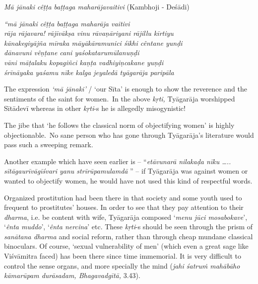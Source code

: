 \textit{Mā jānaki cêṭṭa baṭṭaga maharājavaitivi} (Kambhoji - Deśādi)

\begin{longquote}
\textit{“mā jānaki cêṭṭa baṭṭaga maharāja vaitivi}\\\textit{rāja rājavara! rājīvākṣa vinu rāvaṇāriyani rājillu kīrtiyu}\\\textit{kānakegiyājña mīraka māyākāramunici śikhi cêntane yunḍi}\\\textit{dānavuni vêṇṭane cani yaśokatarumūlanuṇḍi}\\ \textit{vāni māṭalaku kopagiñci kaṇṭa vadhiyiṇcakane yuṇḍi} \\\textit{śrīnāyaka yaśamu nīke kalga jeyaledā tyāgarāja paripāla}
\end{longquote}

\newpage

The expression \textit{‘mā jānaki’} / ‘our Sīta’ is enough to show the reverence and the sentiments of the saint for women.~In the above \textit{kṛti,} Tyāgarāja worshipped Sītādevī whereas in other \textit{kṛti}-s he is allegedly misogynistic! 

The jibe that ‘he follows the classical norm of objectifying women’ is highly objectionable.~No sane person who has gone through Tyāgarāja’s literature would pass such a sweeping remark. 

Another example which have seen earlier is – “\textit{etāvunarā nilakaḍa nīku ….. sītāgaurīvāgīśvari yanu strīrūpamulamdā} ” – if Tyāgarāja was against women or wanted to objectify women, he would have not used this kind of respectful words.

Organized prostitution had been there in that society and some youth used to frequent to prostitutes’ houses. In order to see that they pay attention to their \textit{dharma}, i.e. be content with wife, Tyāgarāja composed ‘\textit{menu jūci mosabokave}’, ‘\textit{ênta muddo}’, ‘\textit{ênta nercina}’ etc. These \textit{kṛti}-s should be seen through the prism of \textit{sanātana dharma} and social reform, rather than through cheap mundane classical binoculars. Of course, ‘sexual vulnerability of men’ (which even a great sage like Viśvāmitra faced) has been there since time immemorial. It is very difficult to control the sense organs, and more specially the mind (\textit{jahi śatruṁ mahābāho kāmarūpam durāsadam, Bhagavadgītā,} 3.43).

